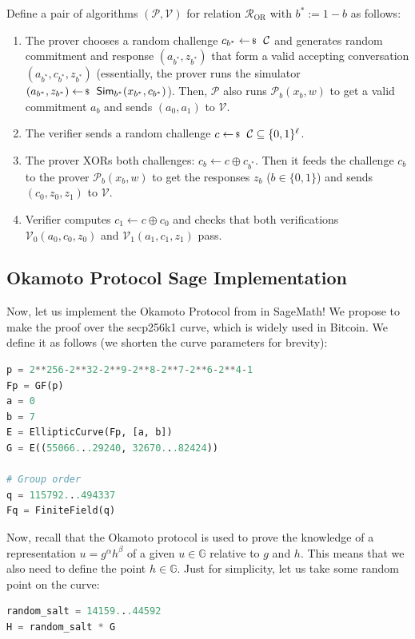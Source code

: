 \documentclass[../lecture-notes-148x210.tex]{subfiles}
\begin{document}
\begin{definition}
    Define a pair of algorithms $(\mathcal{P},\mathcal{V})$ for relation $\mathcal{R}_{\text{OR}}$ with $b^* := 1-b$ as follows:
    \begin{enumerate}
        \item The prover chooses a random challenge $c_{b^*} \leftarrowS \mathcal{C}$ and generates random commitment and response $(a_{b^*}, z_{b^*})$ that form a valid accepting conversation $(a_{b^*}, c_{b^*}, z_{b^*})$ (essentially, the prover runs the simulator $(a_{b^*}, z_{b^*}) \leftarrowS \mathsf{Sim}_{b^*}(x_{b^*}, c_{b^*})$). Then, $\mathcal{P}$ also runs $\mathcal{P}_b(x_b, w)$ to get a valid commitment $a_b$ and sends $(a_0,a_1)$ to $\mathcal{V}$.
        \item The verifier sends a random challenge $c \leftarrowS \mathcal{C} \subseteq \{0,1\}^{\ell}$.
        \item The prover XORs both challenges: $c_b \gets c \oplus c_{b^*}$. Then it feeds the challenge $c_b$ to the prover $\mathcal{P}_b(x_b,w)$ to get the responses $z_b$ ($b \in \{0,1\}$) and sends $(c_0,z_0,z_1)$ to $\mathcal{V}$.
        \item Verifier computes $c_1 \gets c \oplus c_0$ and checks that both verifications $\mathcal{V}_0(a_0,c_0,z_0)$ and $\mathcal{V}_1(a_1,c_1,z_1)$ pass.
    \end{enumerate}
\end{definition}

\subsection{Okamoto Protocol Sage Implementation}

Now, let us implement the Okamoto Protocol from  in SageMath! We propose to make the proof 
over the secp256k1 curve, which is widely used in Bitcoin. We define it as follows (we shorten the curve parameters for brevity):
\begin{lstlisting}[language=Python]
p = 2**256-2**32-2**9-2**8-2**7-2**6-2**4-1
Fp = GF(p)
a = 0
b = 7
E = EllipticCurve(Fp, [a, b])
G = E((55066...29240, 32670...82424))

# Group order
q = 115792...494337
Fq = FiniteField(q)
\end{lstlisting}

Now, recall that the Okamoto protocol is used to prove the knowledge of a
representation $u=g^{\alpha}h^{\beta}$ of a given $u \in \mathbb{G}$ relative to
$g$ and $h$. This means that we also need to define the point $h \in \mathbb{G}$.
Just for simplicity, let us take some random point on the curve:
\begin{lstlisting}[language=Python]
random_salt = 14159...44592
H = random_salt * G
\end{lstlisting}
\end{document}
